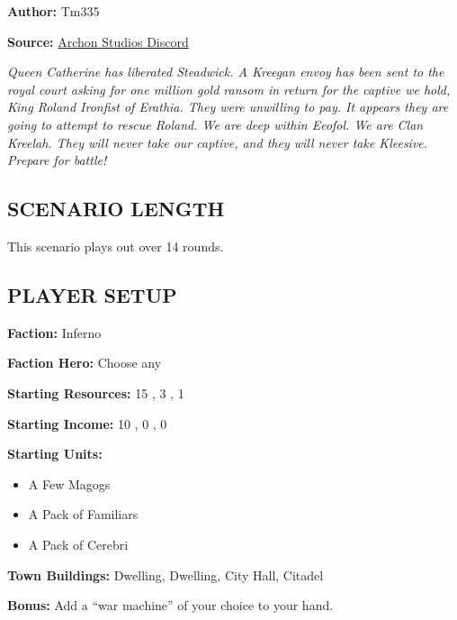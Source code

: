 
\begin{multicols*}{2}

\textbf{Author:} Tm335

\textbf{Source:} \href{https://discord.com/channels/740870068178649108/1253923753981902939/1253923753981902939}{Archon Studios Discord}

\textit{Queen Catherine has liberated Steadwick.
A Kreegan envoy has been sent to the royal court asking for one million gold ransom in return for the captive we hold, King Roland Ironfist of Erathia.
They were unwilling to pay.
It appears they are going to attempt to rescue Roland.
We are deep within Eeofol.
We are Clan Kreelah.
They will never take our captive, and they will never take Kleesive.
Prepare for battle!}

\subsection*{\MakeUppercase{Scenario length}}

This scenario plays out over 14 rounds.

\subsection*{\MakeUppercase{Player setup}}

\textbf{Faction:} Inferno

\textbf{Faction Hero:} Choose any

\textbf{Starting Resources:} 15 , 3 , 1 

\textbf{Starting Income:} 10 , 0 , 0 

\textbf{Starting Units:}

\begin{itemize}
  \item A Few Magogs
  \item A Pack of Familiars
  \item A Pack of Cerebri
\end{itemize}

\textbf{Town Buildings:}  Dwelling,  Dwelling, City Hall, Citadel

\textbf{Bonus:} Add a ``war machine'' of your choice to your hand.


\end{multicols*}
